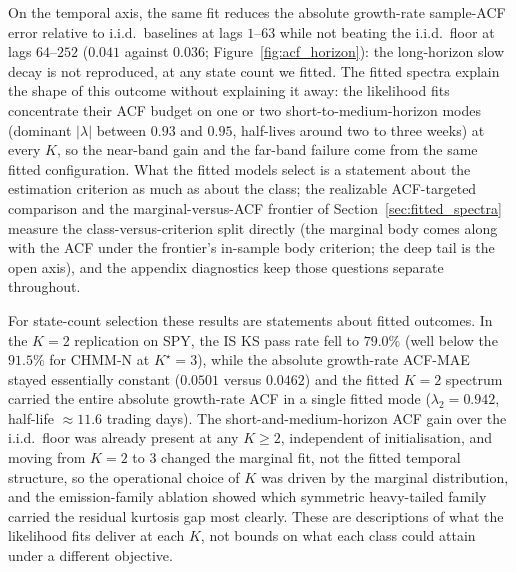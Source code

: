 On the temporal axis, the same fit reduces the absolute growth-rate sample-ACF error relative to i.i.d.\ baselines at lags $1$--$63$ while not beating the i.i.d.\ floor at lags $64$--$252$ ($0.041$ against $0.036$; Figure~\ref{fig:acf_horizon}): the long-horizon slow decay is not reproduced, at any state count we fitted. The fitted spectra explain the shape of this outcome without explaining it away: the likelihood fits concentrate their ACF budget on one or two short-to-medium-horizon modes (dominant $|\lambda|$ between $0.93$ and $0.95$, half-lives around two to three weeks) at every $K$, so the near-band gain and the far-band failure come from the same fitted configuration. What the fitted models select is a statement about the estimation criterion as much as about the class; the realizable ACF-targeted comparison and the marginal-versus-ACF frontier of Section~\ref{sec:fitted_spectra} measure the class-versus-criterion split directly (the marginal body comes along with the ACF under the frontier's in-sample body criterion; the deep tail is the open axis), and the appendix diagnostics keep those questions separate throughout.

For state-count selection these results are statements about fitted outcomes. In the $K = 2$ replication on SPY, the IS KS pass rate fell to $79.0\%$ (well below the $91.5\%$ for CHMM-N at $K^\star = 3$), while the absolute growth-rate ACF-MAE stayed essentially constant ($0.0501$ versus $0.0462$) and the fitted $K = 2$ spectrum carried the entire absolute growth-rate ACF in a single fitted mode ($\lambda_2 = 0.942$, half-life $\approx 11.6$ trading days). The short-and-medium-horizon ACF gain over the i.i.d.\ floor was already present at any $K \ge 2$, independent of initialisation, and moving from $K = 2$ to $3$ changed the marginal fit, not the fitted temporal structure, so the operational choice of $K$ was driven by the marginal distribution, and the emission-family ablation showed which symmetric heavy-tailed family carried the residual kurtosis gap most clearly. These are descriptions of what the likelihood fits deliver at each $K$, not bounds on what each class could attain under a different objective.

